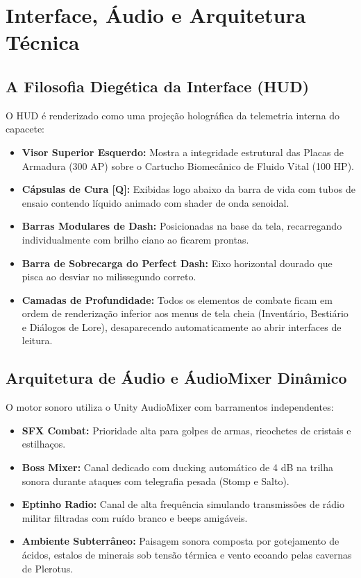 \documentclass[a4paper,12pt]{report}
\begin{document}
\chapter{Interface, Áudio e Arquitetura Técnica}

\section{A Filosofia Diegética da Interface (HUD)}
O HUD é renderizado como uma projeção holográfica da telemetria interna do capacete:
\begin{itemize}
    \item \textbf{Visor Superior Esquerdo:} Mostra a integridade estrutural das Placas de Armadura (300 AP) sobre o Cartucho Biomecânico de Fluido Vital (100 HP).
    \item \textbf{Cápsulas de Cura [Q]:} Exibidas logo abaixo da barra de vida com tubos de ensaio contendo líquido animado com shader de onda senoidal.
    \item \textbf{Barras Modulares de Dash:} Posicionadas na base da tela, recarregando individualmente com brilho ciano ao ficarem prontas.
    \item \textbf{Barra de Sobrecarga do Perfect Dash:} Eixo horizontal dourado que pisca ao desviar no milissegundo correto.
    \item \textbf{Camadas de Profundidade:} Todos os elementos de combate ficam em ordem de renderização inferior aos menus de tela cheia (Inventário, Bestiário e Diálogos de Lore), desaparecendo automaticamente ao abrir interfaces de leitura.
\end{itemize}

\section{Arquitetura de Áudio e ÁudioMixer Dinâmico}
O motor sonoro utiliza o Unity AudioMixer com barramentos independentes:
\begin{itemize}
    \item \textbf{SFX Combat:} Prioridade alta para golpes de armas, ricochetes de cristais e estilhaços.
    \item \textbf{Boss Mixer:} Canal dedicado com ducking automático de 4 dB na trilha sonora durante ataques com telegrafia pesada (Stomp e Salto).
    \item \textbf{Eptinho Radio:} Canal de alta frequência simulando transmissões de rádio militar filtradas com ruído branco e beeps amigáveis.
    \item \textbf{Ambiente Subterrâneo:} Paisagem sonora composta por gotejamento de ácidos, estalos de minerais sob tensão térmica e vento ecoando pelas cavernas de Plerotus.
\end{itemize}
\end{document}
